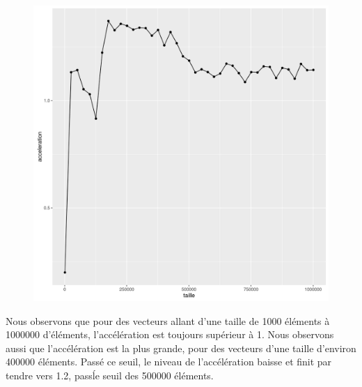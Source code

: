 \documentclass[a4paper,11pt]{scrartcl}
\begin{document}
\begin{figure}[H] \center
   \includegraphics[scale=0.5] {graphes/global_temps_machine_accel13.png}
\end{figure}

Nous observons que pour des vecteurs allant d'une taille de 1000 \'el\'ements \`a 1000000 d'\'el\'ements, l'acc\'el\'eration est toujours sup\'erieur \`a 1. Nous observons aussi que l'acc\'el\'eration est la plus grande, pour des vecteurs d'une taille d'environ 400000 \'el\'ements. Pass\'e ce seuil, le niveau de l'acc\'el\'eration baisse et finit par tendre vers 1.2, pass\' le seuil des 500000 \'el\'ements.   
\end{document}
